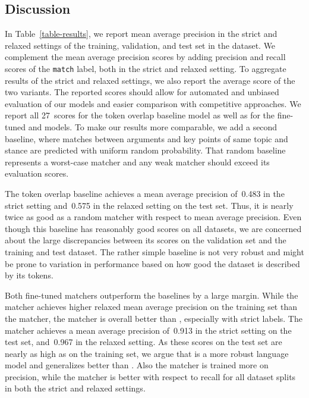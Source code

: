 \subsection{Discussion}
In Table~\ref{table-results}, we report mean average precision in the strict and relaxed settings of the training, 
validation, and test set in the \ArgKP dataset.
We complement the mean average precision scores by adding precision and recall scores of the \texttt{match} label, 
both in the strict and relaxed setting.
To aggregate results of the strict and relaxed settings, we also report the average score of the two variants.
The reported scores should allow for automated and unbiased evaluation of our models and easier comparison with competitive approaches.
We report all 27~scores for the token overlap baseline model as well as for the fine-tuned \BertBase and \RobertaBase models.
To make our results more comparable, we add a second baseline, where matches between arguments and key points of same 
topic and stance are predicted with uniform random probability.
That random baseline represents a worst-case matcher and any weak matcher should exceed its evaluation scores.

The token overlap baseline achieves a mean average precision of~0.483 in the strict setting and~0.575 in the relaxed 
setting on the test set.
Thus, it is nearly twice as good as a random matcher with respect to mean average precision.
Even though this baseline has reasonably good scores on all datasets, we are concerned about the large discrepancies 
between its scores on the validation set and the training and test dataset. 
The rather simple baseline is not very robust and might be prone to variation in performance based on how 
good the dataset is described by its tokens.

Both fine-tuned matchers outperform the baselines by a large margin.
While the \BertBase matcher achieves higher relaxed mean average precision on the training set than the \RobertaBase 
matcher, the \RobertaBase matcher is overall better than \Bert, especially with strict labels.
The \RobertaBase matcher achieves a mean average precision of~0.913 in the strict setting on the test set, and~0.967 
in the relaxed setting.
As these scores on the test set are nearly as high as on the training set, we argue that \Roberta is a more robust 
language model and generalizes better than \Bert.
Also the \RobertaBase matcher is trained more on precision, while the \BertBase matcher is better with respect to 
recall for all dataset splits in both the strict and relaxed settings.
